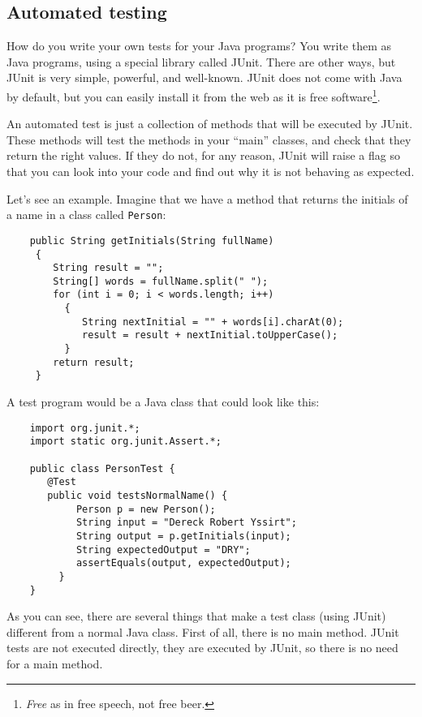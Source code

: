 \subsection{Automated testing}
\label{sec:automated-testing}

How do you write your own tests for your Java programs? You write them
as Java programs, using a special library called JUnit. There are
other ways, but JUnit is very simple, powerful, and well-known. JUnit
does not come with Java by default, but you can easily install it from
the web as it is free software\footnote{\emph{Free} as in free speech,
not free beer.}. 

An automated test is just a collection of methods that will be
executed by JUnit. These methods will test the methods in your
``main'' classes, and check that they return the right values. If they
do not, for any reason, JUnit will raise a flag so that you can look
into your code and find out why it is not behaving as expected. 

Let's see an example. Imagine that we have 
a method that returns the initials of a name
in a class called \verb+Person+: 

\begin{verbatim}
    public String getInitials(String fullName)
     {
        String result = "";
        String[] words = fullName.split(" ");
        for (int i = 0; i < words.length; i++)
          {
             String nextInitial = "" + words[i].charAt(0);
             result = result + nextInitial.toUpperCase();
          }
        return result;
     }
\end{verbatim}

A test program would be a Java class that could look like this: 

\begin{verbatim}
    import org.junit.*;
    import static org.junit.Assert.*;
    
    public class PersonTest {    
       @Test
       public void testsNormalName() {
            Person p = new Person();
            String input = "Dereck Robert Yssirt";
            String output = p.getInitials(input);
            String expectedOutput = "DRY";
            assertEquals(output, expectedOutput);
         }
    }
\end{verbatim}

As you can see, there are several things that make a test class (using
JUnit) different from a normal Java class. First of all, there is no
main method. JUnit tests are not executed directly, they are executed
by JUnit, so there is no need for a main method. 

